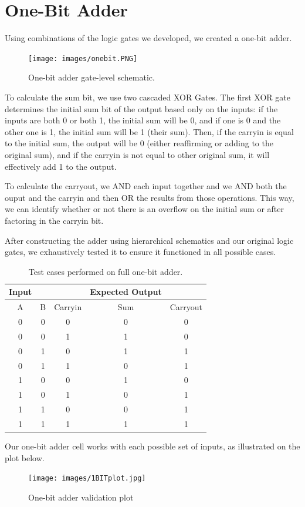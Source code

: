 \documentclass{article}
\begin{document}
\section{One-Bit Adder}
Using combinations of the logic gates we developed, we created a one-bit adder. 
\begin{figure}[H]
  \begin{center}
  \texttt{[image: images/onebit.PNG]}
  \caption{One-bit adder gate-level schematic.}   
  \label{fig:adder_schematic}
  \end{center}
\end{figure}
To calculate the sum bit, we use two cascaded XOR Gates. The first XOR gate determines the initial sum bit of the output based only on the inputs: if the inputs are both 0 or both 1, the initial sum will be 0, and if one is 0 and the other one is 1, the initial sum will be 1 (their sum). Then, if the carryin is equal to the initial sum, the output will be 0 (either reaffirming or adding to the original sum), and if the carryin is not equal to other original sum, it will effectively add 1 to the output.

To calculate the carryout, we AND each input together and we AND both the ouput and the carryin and then OR the results from those operations. This way, we can identify whether or not there is an overflow on the initial sum or after factoring in the carryin bit.

After constructing the adder using hierarchical schematics and our original logic gates, we exhaustively tested it to ensure it functioned in all possible cases.
\begin{table}[H]
\begin{center}
 \begin{tabular}{|c c c | c c |} 
 \hline  
 Input &  & & Expected Output & \\
 \hline
 A & B & Carryin & Sum & Carryout\\ 
 \hline
 0 & 0 & 0 & 0 & 0 \\ 
 \hline
 0 & 0 & 1 & 1 & 0 \\ 
 \hline
 0 & 1 & 0 & 1 & 1 \\ 
 \hline
 0 & 1 & 1 & 0 & 1 \\ 
 \hline
 1 & 0 & 0 & 1 & 0 \\ 
 \hline
 1 & 0 & 1 & 0 & 1 \\ 
 \hline
 1 & 1 & 0 & 0 & 1 \\ 
 \hline
 1 & 1 & 1 & 1 & 1 \\ 
 \hline 
\end{tabular}

\caption{Test cases performed on full one-bit adder.}

Our one-bit adder cell works with each possible set of inputs, as illustrated on the plot below.

\end{center}
\end{table}
\begin{figure}[H]
  \begin{center}      
  \texttt{[image: images/1BITplot.jpg]}
  \caption{One-bit adder validation plot}   
  \label{fig:ANDplot}
  \end{center}
\end{figure}
\end{document}
